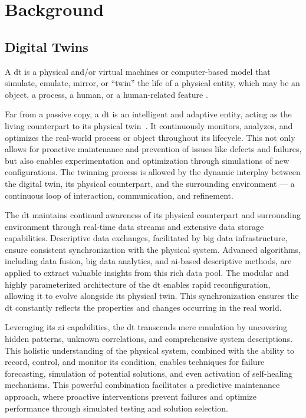 \chapter{Background}\label{ch:background}

\section{Digital Twins}

A \acrfull{dt} is a physical and/or virtual machines or computer-based model that simulate, emulate, mirror, or ``twin'' the life of a physical entity, which may be an object, a process, a human, or a human-related feature \parencite{barricelliMultiModalApproachCreating2022}.

Far from a passive copy, a \acrshort{dt} is an intelligent and adaptive entity, acting as the living counterpart to its physical twin~\parencite{grievesDigitalTwinManufacturing2015,kritzingerDigitalTwinManufacturing2018}. It continuously monitors, analyzes, and optimizes the real-world process or object throughout its lifecycle. This not only allows for proactive maintenance and prevention of issues like defects and failures, but also enables experimentation and optimization through simulations of new configurations. The twinning process is allowed by the dynamic interplay between the digital twin, its physical counterpart, and the surrounding environment --- a continuous loop of interaction, communication, and refinement.

The \acrshort{dt} maintains continual awareness of its physical counterpart and surrounding environment through real-time data streams and extensive data storage capabilities. Descriptive data exchanges, facilitated by big data infrastructure, ensure consistent synchronization with the physical system. Advanced algorithms, including data fusion, big data analytics, and \acrshort{ai}-based descriptive methods, are applied to extract valuable insights from this rich data pool. The modular and highly parameterized architecture of the \acrshort{dt} enables rapid reconfiguration, allowing it to evolve alongside its physical twin. This synchronization ensures the \acrshort{dt} constantly reflects the properties and changes occurring in the real world.

Leveraging its \acrshort{ai} capabilities, the \acrshort{dt} transcends mere emulation by uncovering hidden patterns, unknown correlations, and comprehensive system descriptions. This holistic understanding of the physical system, combined with the ability to record, control, and monitor its condition, enables techniques for failure forecasting, simulation of potential solutions, and even activation of self-healing mechanisms. This powerful combination facilitates a predictive maintenance approach, where proactive interventions prevent failures and optimize performance through simulated testing and solution selection.


